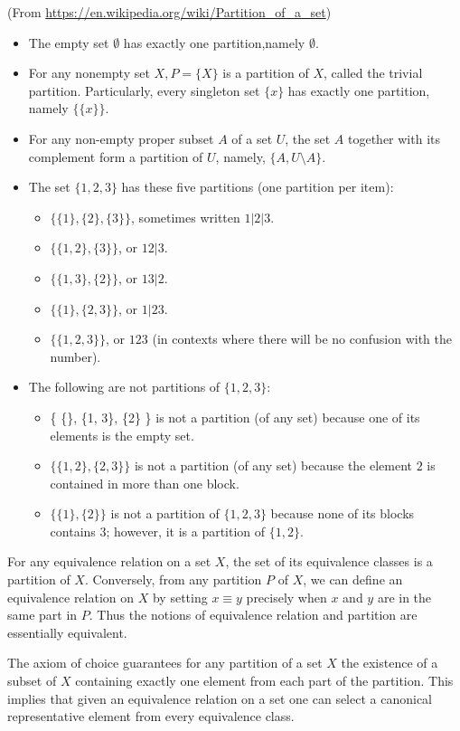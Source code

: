 \begin{example}
	(From \url{https://en.wikipedia.org/wiki/Partition_of_a_set})
	\begin{itemize}
		\item The empty set $\emptyset$ has exactly one partition,namely $\emptyset$.
		\item For any nonempty set $X, P = \{X\}$ is a partition of $X$, called the trivial partition.
		\subitem Particularly, every singleton set $\{x\}$ has exactly one partition, namely $\{ \{x\} \}$.
		\item For any non-empty proper subset $A$ of a set $U$, the set $A$ together with its complement form a partition of $U$, namely, $\{A, U \setminus A \}$.
		\item The set $\{ 1, 2, 3 \}$ has these five partitions (one partition per item):
		\begin{itemize}
			\item $\{ \{1\}, \{2\}, \{3\} \}$, sometimes written $1|2|3$.
			\item $\{ \{1, 2\}, \{3\} \}$, or $12|3$.
			\item $\{ \{1, 3\}, \{2\} \}$, or $13|2$.
			\item $\{ \{1\}, \{2, 3\} \}$, or $1|23$.
			\item $\{ \{1, 2, 3\} \}$, or $123$ (in contexts where there will be no confusion with the number).
		\end{itemize}
		\item The following are not partitions of $\{ 1, 2, 3 \}$:
		\begin{itemize}
			\item \{ \{\}, \{1, 3\}, \{2\} \} is not a partition (of any set) because one of its elements is the empty set.
			\item $\{ \{1, 2\}, \{2, 3\} \}$ is not a partition (of any set) because the element $2$ is contained in more than one block.
			\item $\{ \{1\}, \{2\} \}$ is not a partition of $\{1, 2, 3\}$ because none of its blocks contains $3$; however, it is a partition of $\{1, 2\}$.
		\end{itemize}
	\end{itemize}
\end{example}

\begin{definition}
	For any equivalence relation on a set $X$, the set of its equivalence classes is a partition of $X$. Conversely, from any partition $P$ of $X$, we can define an equivalence relation on $X$ by setting $x\equiv y$ precisely when $x$ and $y$ are in the same part in $P$. Thus the notions of equivalence relation and partition are essentially equivalent.
	
	The axiom of choice guarantees for any partition of a set $X$ the existence of a subset of $X$ containing exactly one element from each part of the partition. This implies that given an equivalence relation on a set one can select a canonical representative element from every equivalence class.
\end{definition}

